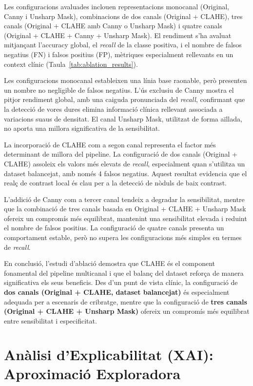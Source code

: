 \documentclass[conference]{IEEEtran}
\begin{document}
Les configuracions avaluades inclouen representacions monocanal (Original, Canny i
Unsharp Mask), combinacions de dos canals (Original + CLAHE), tres canals
(Original + CLAHE amb Canny o Unsharp Mask) i quatre canals
(Original + CLAHE + Canny + Unsharp Mask). El rendiment s’ha avaluat mitjançant
l’accuracy global, el \textit{recall} de la classe positiva, i el nombre de falsos
negatius (FN) i falsos positius (FP), mètriques especialment rellevants en un context
clínic (Taula~\ref{tab:ablation_results}).




Les configuracions monocanal estableixen una línia base raonable, però presenten un
nombre no negligible de falsos negatius. L’ús exclusiu de Canny mostra el pitjor
rendiment global, amb una caiguda pronunciada del \textit{recall}, confirmant que la
detecció de vores dures elimina informació clínica rellevant associada a variacions
suaus de densitat. El canal Unsharp Mask, utilitzat de forma aïllada, no aporta una
millora significativa de la sensibilitat.

La incorporació de CLAHE com a segon canal representa el factor més determinant de
millora del pipeline. La configuració de dos canals (Original + CLAHE) assoleix els
valors més elevats de \textit{recall}, especialment quan s’utilitza un dataset
balancejat, amb només 4 falsos negatius. Aquest resultat evidencia que el realç de
contrast local és clau per a la detecció de nòduls de baix contrast.

L’addició de Canny com a tercer canal tendeix a degradar la sensibilitat, mentre que
la combinació de tres canals basada en Original + CLAHE + Unsharp Mask ofereix un
compromís més equilibrat, mantenint una sensibilitat elevada i reduint el nombre de
falsos positius. La configuració de quatre canals presenta un comportament estable,
però no supera les configuracions més simples en termes de \textit{recall}.

En conclusió, l’estudi d’ablació demostra que CLAHE és el component fonamental del
pipeline multicanal i que el balanç del dataset reforça de manera significativa els
seus beneficis. Des d’un punt de vista clínic, la configuració de \textbf{dos canals
(Original + CLAHE, dataset balancejat)} és especialment adequada per a escenaris de
cribratge, mentre que la configuració de \textbf{tres canals (Original + CLAHE +
Unsharp Mask)} ofereix un compromís més equilibrat entre sensibilitat i especificitat.


\section{Anàlisi d’Explicabilitat (XAI): Aproximació Exploradora}
\end{document}
